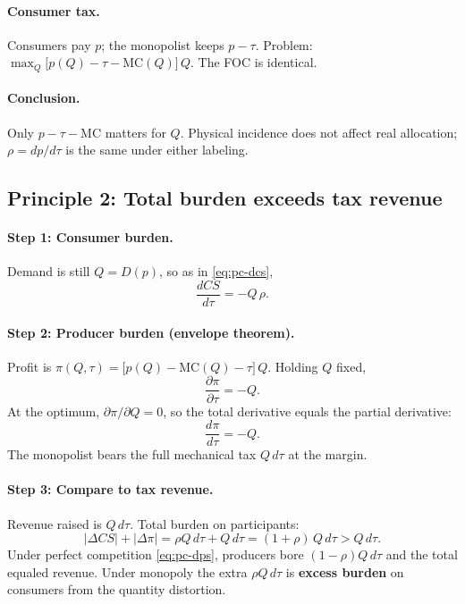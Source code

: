 \documentclass[11pt]{article}
\begin{document}
\paragraph{Consumer tax.}
Consumers pay $p$; the monopolist keeps $p - \tau$.  Problem:
$\max_Q \bigl[p(Q) - \tau - \mathrm{MC}(Q)\bigr]\,Q$.
The FOC is identical.

\paragraph{Conclusion.}
Only $p - \tau - \mathrm{MC}$ matters for $Q$.  Physical incidence does not
affect real allocation; $\rho = dp/d\tau$ is the same under either labeling.

\subsection{Principle 2: Total burden exceeds tax revenue}

\paragraph{Step 1: Consumer burden.}
Demand is still $Q = D(p)$, so as in \eqref{eq:pc-dcs},
\begin{equation}
  \frac{dCS}{d\tau} = -Q\,\rho.
  \label{eq:mono-dcs}
\end{equation}

\paragraph{Step 2: Producer burden (envelope theorem).}
Profit is $\pi(Q,\tau) = \bigl[p(Q) - \mathrm{MC}(Q) - \tau\bigr]\,Q$.
Holding $Q$ fixed,
\[
  \frac{\partial \pi}{\partial \tau} = -Q.
\]
At the optimum, $\partial\pi/\partial Q = 0$, so the total derivative
equals the partial derivative:
\begin{equation}
  \frac{d\pi}{d\tau} = -Q.
  \label{eq:mono-dpi}
\end{equation}
The monopolist bears the full mechanical tax $Q\,d\tau$ at the margin.

\paragraph{Step 3: Compare to tax revenue.}
Revenue raised is $Q\,d\tau$.  Total burden on participants:
\[
  |\Delta CS| + |\Delta\pi|
  = \rho Q\,d\tau + Q\,d\tau
  = (1+\rho)\,Q\,d\tau
  > Q\,d\tau.
\]
Under perfect competition \eqref{eq:pc-dps}, producers bore
$(1-\rho)Q\,d\tau$ and the total equaled revenue.  Under monopoly the
extra $\rho Q\,d\tau$ is \textbf{excess burden} on consumers from the
quantity distortion.
\end{document}
